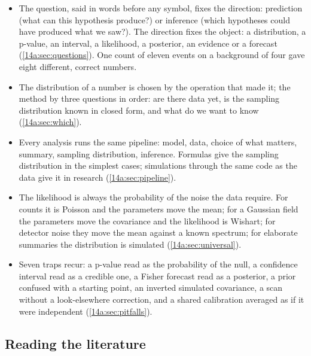 \begin{recap}
\begin{itemize}[itemsep=1pt,leftmargin=1.2em]
  \item The question, said in words before any symbol, fixes the direction: prediction
        (what can this hypothesis produce?) or inference (which hypotheses could have
        produced what we saw?). The direction fixes the object: a distribution, a
        p-value, an interval, a likelihood, a posterior, an evidence or a forecast
        (\cref{14a:sec:questions}). One count of eleven events on a background of four
        gave eight different, correct numbers.
  \item The distribution of a number is chosen by the operation that made it; the
        method by three questions in order: are there data yet, is the sampling
        distribution known in closed form, and what do we want to know
        (\cref{14a:sec:which}).
  \item Every analysis runs the same pipeline: model, data, choice of what matters,
        summary, sampling distribution, inference. Formulas give the sampling
        distribution in the simplest cases; simulations through the same code as the
        data give it in research (\cref{14a:sec:pipeline}).
  \item The likelihood is always the probability of the noise the data require. For
        counts it is Poisson and the parameters move the mean; for a Gaussian field the
        parameters move the covariance and the likelihood is Wishart; for detector
        noise they move the mean against a known spectrum; for elaborate summaries the
        distribution is simulated (\cref{14a:sec:universal}).
  \item Seven traps recur: a p-value read as the probability of the null, a confidence
        interval read as a credible one, a Fisher forecast read as a posterior, a prior
        confused with a starting point, an inverted simulated covariance, a scan
        without a look-elsewhere correction, and a shared calibration averaged as if it
        were independent (\cref{14a:sec:pitfalls}).
\end{itemize}
\end{recap}

\subsection*{Reading the literature}
\label{14a:sec:reading}

